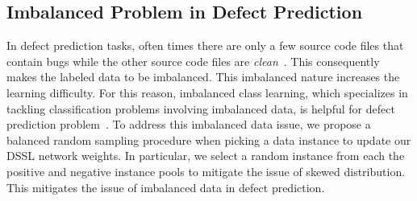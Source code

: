 \subsection{Imbalanced Problem in Defect Prediction}
\label{sec:imbalanced}
In defect prediction tasks, often times there are only a few source code files that contain bugs while the other source code files are \textit{clean}~\cite{khoshgoftaar2010attribute}. This consequently makes the labeled data to be imbalanced. This imbalanced nature increases the learning difficulty. For this reason, imbalanced class learning, which specializes in tackling classification problems involving imbalanced data, is helpful for defect prediction problem~\cite{wang2013using}. To address this imbalanced data issue, we propose a balanced random sampling procedure when picking a data instance to update our DSSL network weights. In particular, we select a random instance from each the positive and negative instance pools to mitigate the issue of skewed distribution. This mitigates the issue of imbalanced data in defect prediction. 


%


